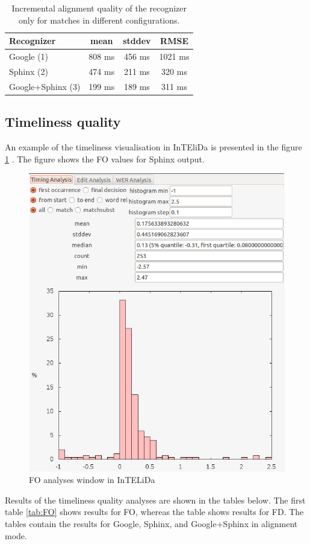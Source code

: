 \begin {table}
\begin{center}
\caption {Incremental alignment quality of the recognizer only for matches in
different configurations.}
    \begin{tabular}{ l  c  c  c }
    \toprule
    Recognizer & mean  & stddev & RMSE\\ \toprule
    Google (1)   & 808 ms & 456 ms & 1021 ms \\ 
    Sphinx (2)  &  474 ms & 211 ms & 320 ms \\ 
    Google+Sphinx (3)  & 199 ms & 189 ms & 311 ms \\ 
    \bottomrule  
    \end{tabular}
    \label{tab:alincrms} 
\end{center}

\end {table}
\subsection {Timeliness quality}
An example of the timeliness visualisation in InTEliDa is presented in the
figure \ref{fig:vis} . The figure shows the FO values for Sphinx output. 
\begin{figure}[htbp]
  \centering
    \includegraphics[width=1.0\textwidth]{images/sphinxFO.png}
 \caption{ FO analyses window in InTELiDa}
  \label{fig:vis}
\end {figure}
Results of the timeliness quality analyses are shown in the
tables below. The first table \ref {tab:FO} shows results for FO, whereas the
table  \label{tab:FD} shows results for FD.  The tables contain the results for
Google, Sphinx, and Google+Sphinx in alignment mode. 

